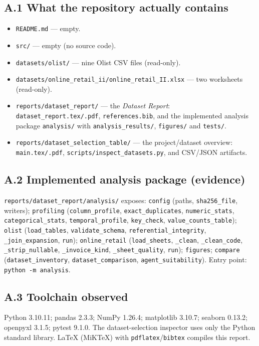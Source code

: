 \documentclass[11pt,a4paper]{article}
\newcommand{\code}[1]{\texttt{#1}}
\begin{document}
\subsection*{A.1 What the repository actually contains}
\begin{itemize}
\item \code{README.md} --- empty.
\item \code{src/} --- empty (no source code).
\item \code{datasets/olist/} --- nine Olist CSV files (read-only).
\item \code{datasets/online\_retail\_ii/online\_retail\_II.xlsx} --- two worksheets (read-only).
\item \code{reports/dataset\_report/} --- the \emph{Dataset Report}: \code{dataset\_report.tex/.pdf}, \code{references.bib}, and the implemented analysis package \code{analysis/} with \code{analysis\_results/}, \code{figures/} and \code{tests/}.
\item \code{reports/dataset\_selection\_table/} --- the project/dataset overview: \code{main.tex/.pdf}, \code{scripts/inspect\_datasets.py}, and CSV/JSON artifacts.
\end{itemize}

\subsection*{A.2 Implemented analysis package (evidence)}
\code{reports/dataset\_report/analysis/} exposes: \code{config} (paths, \code{sha256\_file}, writers); \code{profiling} (\code{column\_profile}, \code{exact\_duplicates}, \code{numeric\_stats}, \code{categorical\_stats}, \code{temporal\_profile}, \code{key\_check}, \code{value\_counts\_table}); \code{olist} (\code{load\_tables}, \code{validate\_schema}, \code{referential\_integrity}, \code{\_join\_expansion}, \code{run}); \code{online\_retail} (\code{load\_sheets}, \code{\_clean}, \code{\_clean\_code}, \code{\_strip\_nullable}, \code{\_invoice\_kind}, \code{\_sheet\_quality}, \code{run}); \code{figures}; \code{compare} (\code{dataset\_inventory}, \code{dataset\_comparison}, \code{agent\_suitability}). Entry point: \code{python -m analysis}.

\subsection*{A.3 Toolchain observed}
Python 3.10.11; pandas 2.3.3; NumPy 1.26.4; matplotlib 3.10.7; seaborn 0.13.2; openpyxl 3.1.5; pytest 9.1.0. The dataset-selection inspector uses only the Python standard library. LaTeX (MiKTeX) with \code{pdflatex}/\code{bibtex} compiles this report.
\end{document}
